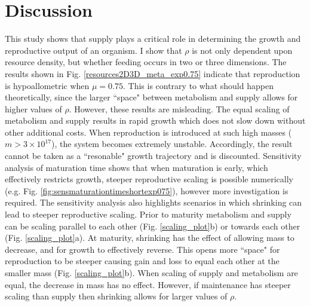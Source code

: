 \documentclass[a4paper, 11pt, hidelinks]{article} %
\begin{document}
\section{Discussion}
	\linenumbers
	This study shows that supply plays a critical role in determining the growth and reproductive output of an organism.  I show that $ \rho $ is not only dependent upon resource density, but whether feeding occurs in two or three dimensions.  
	The results shown in Fig. \ref{resources2D3D_meta_exp0.75} indicate that reproduction is hypoallometric when $ \mu = 0.75 $.  This is contrary to what should happen theoretically, since the larger ``space" between metabolism and supply allows for higher values of $ \rho $. However, these results are misleading.  The equal scaling of metabolism and supply results in rapid growth which does not slow down without other additional costs.  When reproduction is introduced at such high masses ($ m > 3\times 10^{17} $), the system becomes extremely unstable.  Accordingly, the result cannot be taken as a ``resonable" growth trajectory and is discounted.  Sensitivity analysis of maturation time shows that when maturation is early, which effectively restricts growth, steeper reproductive scaling is possible numerically (e.g. Fig. \ref{fig:sensmaturationtimeshortexp075}), however more investigation is required.
%	
%	
	The sensitivity analysis also highlights scenarios in which shrinking can lead to steeper reproductive scaling.  Prior to maturity metabolism and supply can be scaling parallel to each other (Fig. \ref{scaling_plot}b) or towards each other (Fig. \ref{scaling_plot}a).  At maturity, shrinking has the effect of allowing mass to decrease, and for growth to effectively reverse.  This opens more ``space" for reproduction to be steeper causing gain and loss to equal each other at the smaller mass (Fig. \ref{scaling_plot}b).  When scaling of supply and metabolism are equal, the decrease in mass has no effect. However, if maintenance has steeper scaling than supply then shrinking allows for larger values of $ \rho $.
\end{document}
